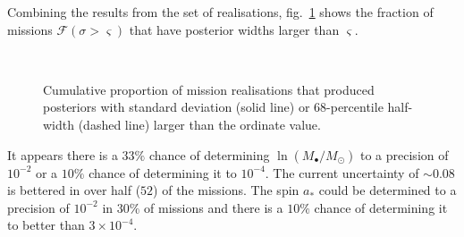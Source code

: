 \documentclass[useAMS,usedcolumn,usegraphicx,usenatbib]{mn2e}
\newcommand{\figref}[1]{fig.~\ref{fig:#1}}
\begin{document}
Combining the results from the set of realisations, \figref{Widths} shows the fraction of missions $\mathcal{F}(\sigma > \varsigma)$ that have posterior widths larger than $\varsigma$.
\begin{figure}
\begin{center}
    \quad 
    \\
    \quad
\caption{Cumulative proportion of mission realisations that produced posteriors with standard deviation (solid line) or $68$-percentile half-width (dashed line) larger than the ordinate value.\label{fig:Widths}}
  \end{center}
\end{figure}
It appears there is a $33\%$ chance of determining $\ln (M_\bullet/M_\odot)$ to a precision of $10^{-2}$ or a $10\%$ chance of determining it to $10^{-4}$. The current uncertainty of $\sim 0.08$ is bettered in over half ($52$) of the missions. The spin $a_\ast$ could be determined to a precision of $10^{-2}$ in $30\%$ of missions and there is a $10\%$ chance of determining it to better than $3\times 10^{-4}$.
\end{document}
